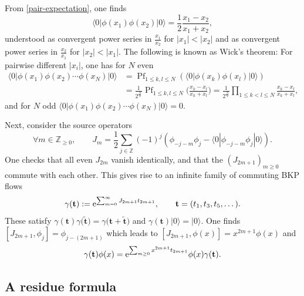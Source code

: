 \documentclass[pdftex]{sigma}
\numberwithin{equation}{section}
\begin{document}
From \eqref{pair-expectation}, one finds
\begin{equation*}
 \langle 0|\phi(x_1)\phi(x_2)|0\rangle
 =\frac{1}{2} \frac{x_1-x_2}{x_1+x_2},
\end{equation*}
understood as convergent power series in
$\frac{x_1}{x_2}$ for $|x_1|<|x_2|$ and as convergent power series in
$\frac{x_2}{x_1}$ for $|x_2|<|x_1|$. The following is known as Wick's theorem:
For pairwise different $|x_i|$, one has for $N$ even
\begin{align}
\nonumber
 \langle 0|\phi(x_1)\phi(x_2)\cdots
 \phi(x_{N})|0\rangle
 & =\operatorname{Pf}_{1\leq k,l \leq N}
 (\langle 0|\phi(x_k)\phi(x_l)|0\rangle) \\
 &= \frac{1}{2^{\frac{N}{2}}}
 \operatorname{Pf}_{1\leq k,l \leq N}
 \biggl(\frac{x_k-x_l}{x_k+x_l}\biggr)
= \frac{1}{2^{\frac{N}{2}}}\prod_{1\leq k<l\leq N}
\frac{x_k-x_l}{x_k+x_l},\label{Wick}
\end{align}
and for $N$ odd $\langle 0|\phi(x_1)\phi(x_2)\cdots
 \phi(x_{N})|0\rangle=0$.

Next, consider the source operators
\begin{equation*}
\forall m \in \mathbb{Z}_{\geq 0}, \qquad J_m = \frac{1}{2} \sum_{j\in\mathbb{Z}}(-1)^j(\phi_{-j-m}\phi_{j}-
 \langle 0 |\phi_{-j-m}\phi_{j}|0\rangle).
\end{equation*}
One checks that all even $J_{2m}$ vanish identically, and that the $(J_{2m+1})_{m \geq 0}$ commute with each other. This gives rise to an infinite
family of commuting BKP flows
\[
\gamma(\mathbf{t}) := {\rm e}^{\sum_{m=0}^\infty J_{2 m+1} t_{2m+1} },\qquad
\mathbf{t}=(t_1,t_3,t_5,\dots).
\]
These satisfy $\gamma(\mathbf{t}) \gamma\bigl(\tilde{\mathbf{t}}\bigr)
= \gamma\bigl(\mathbf{t}+\tilde{\mathbf{t}}\bigr)$ and $\gamma(\mathbf{t})|0\rangle
=|0\rangle$. One finds $[J_{2m+1},\phi_j]=\phi_{j-(2m+1)}$ which leads to
$[J_{2m+1},\phi(x)]=x^{2m+1} \phi(x)$ and
\begin{equation}
\label{gammatphiz}
 \gamma(\mathbf{t}) \phi(x)=
 {\rm e}^{\sum_{m \geq 0} x^{2 m+1} t_{2m+1} } \phi(x)\gamma(\mathbf{t}).
\end{equation}

\subsection{A residue formula}
\end{document}
